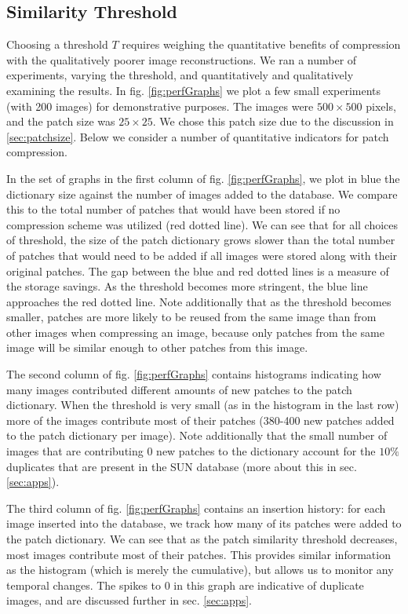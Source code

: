 \subsection{Similarity Threshold}

Choosing a threshold $T$ requires weighing the quantitative benefits of compression with the qualitatively poorer image reconstructions. We ran a number of experiments, varying the threshold, and quantitatively and qualitatively examining the results. In fig. \ref{fig:perfGraphs} we plot a few small experiments (with 200 images) for demonstrative purposes. The images were $500\times 500$ pixels, and the patch size was $25\times 25$. We chose this patch size due to the discussion in \ref{sec:patchsize}. Below we consider a number of quantitative indicators for patch compression. 

In the set of graphs in the first column of fig. \ref{fig:perfGraphs}, we plot in blue the dictionary size against the number of images added to the database. We compare this to the total number of patches that would have been stored if no compression scheme was utilized (red dotted line). We can see that for all choices of threshold, the size of the patch dictionary grows slower than the total number of patches that would need to be added if all images were stored along with their original patches. The gap between the blue and red dotted lines is a measure of the storage savings. As the threshold becomes more stringent, the blue line approaches the red dotted line. Note additionally that as the threshold becomes smaller, patches are more likely to be reused from the same image than from other images when compressing an image, because only patches from the same image will be similar enough to other patches from this image.

The second column of fig. \ref{fig:perfGraphs} contains histograms indicating how many images contributed different amounts of new patches to the patch dictionary. When the threshold is very small (as in the histogram in the last row) more of the images contribute most of their patches (380-400 new patches added to the patch dictionary per image). Note additionally that the small number of images that are contributing 0 new patches to the dictionary account for the $10\%$ duplicates that are present in the SUN database (more about this in sec. \ref{sec:apps}).

The third column of fig. \ref{fig:perfGraphs} contains an insertion history: for each image inserted into the database, we track how many of its patches were added to the patch dictionary. We can see that as the patch similarity threshold decreases, most images contribute most of their patches. This provides similar information as the histogram (which is merely the cumulative), but allows us to monitor any temporal changes. The spikes to 0 in this graph are indicative of duplicate images, and are discussed further in sec. \ref{sec:apps}.

